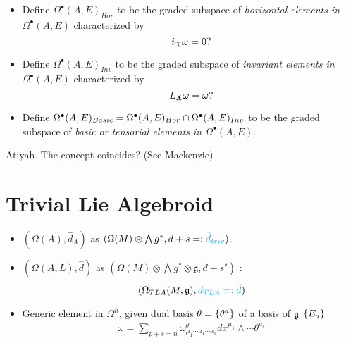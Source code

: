 {\begin{definition}
    \begin{itemize}
        
    \item Define $\Omega^\bullet(A, E)_{Hor}$ to be the graded subspace of \emph{horizontal elements in $\Omega^\bullet(A, E)$} characterized by 
    \[
    i_{\bm{\mathfrak{X}}} \omega = 0?
    \]
    
    \item Define $\Omega^\bullet(A, E)_{Inv}$ to be the graded subspace of \emph{invariant elements in $\Omega^\bullet(A, E)$} characterized by 
    \[
    L_{\bm{\mathfrak{X}}} \omega = \omega?
    \]
    
    \item Define $\Omega^\bullet(A, E)_{Basic} = \Omega^\bullet(A, E)_{Hor} \cap \Omega^\bullet(A, E)_{Inv}$ to be the graded subspace of \emph{basic or tensorial elements in $\Omega^\bullet(A, E)$}.
        
    \end{itemize}
    
\end{definition}

\begin{example}
Atiyah. The concept coincides? (See Mackenzie)
\end{example}}
\section{Trivial Lie Algebroid}

{\color{gray}
\begin{itemize}
    
\item $(\Omega(A), \hat d_A)$ as $(\Omega(M)\otimes \bigwedge g^*, d + s =: \textcolor{cyan}{\hat d_{triv}})$.

\item $(\Omega(A, L), \hat d)$ as $(\Omega(M)\otimes \bigwedge g^* \otimes \mathfrak g, d + s')$ : \[(\Omega_{TLA}(M, \mathfrak g), \textcolor{cyan}{\hat d_{TLA} =: \hat d})\]

\item Generic element in $\Omega^n$, given dual basis $\theta = \left\{ \theta^a \right\}$ of a basis of $\mathfrak{g}$ $\left\{ E_a \right\}$
\begin{align*}
    \omega = \sum_{p + s = n} \omega^\theta_{\mu_1 \cdots a_1 \cdots a_s} dx^{\mu_1} \wedge \cdots \theta^{a_s}
\end{align*}
    
\end{itemize}
}
\linea

